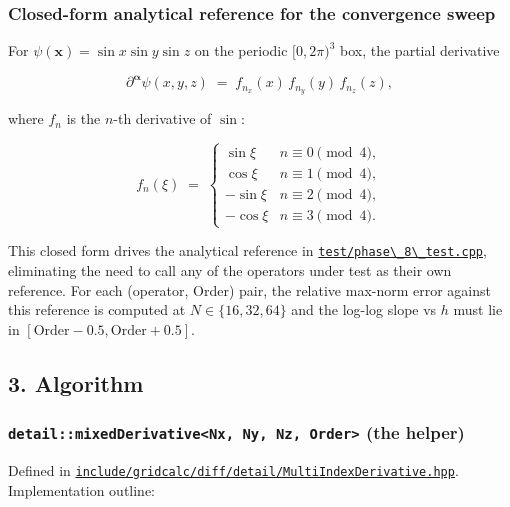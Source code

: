 \subsubsection{Closed-form analytical reference for the convergence
sweep}\label{closed-form-analytical-reference-for-the-convergence-sweep}

For \(\psi(\mathbf{x}) = \sin x \sin y \sin z\) on the periodic
\([0, 2\pi)^3\) box, the partial derivative

\[
\partial^{\boldsymbol\alpha}\psi(x, y, z) \;=\; f_{n_x}(x)\,f_{n_y}(y)\,f_{n_z}(z),
\]

where \(f_n\) is the \(n\)-th derivative of \(\sin\):

\[
f_n(\xi) \;=\; \begin{cases}\sin\xi & n \equiv 0\pmod 4,\\ \cos\xi & n \equiv 1\pmod 4,\\ -\sin\xi & n \equiv 2\pmod 4,\\ -\cos\xi & n \equiv 3\pmod 4.\end{cases}
\]

This closed form drives the analytical reference in
\href{../../../test/phase_8_test.cpp}{\passthrough{\lstinline!test/phase\_8\_test.cpp!}},
eliminating the need to call any of the operators under test as their
own reference. For each (operator, Order) pair, the relative max-norm
error against this reference is computed at \(N \in \{16, 32, 64\}\) and
the log-log slope vs \(h\) must lie in
\([\text{Order} - 0.5, \text{Order} + 0.5]\).

\subsection{3. Algorithm}\label{algorithm}

\subsubsection{\texorpdfstring{\texttt{detail::mixedDerivative\textless{}Nx,\ Ny,\ Nz,\ Order\textgreater{}}
(the
helper)}{detail::mixedDerivative\textless Nx, Ny, Nz, Order\textgreater{} (the helper)}}\label{detailmixedderivativenx-ny-nz-order-the-helper}

Defined in
\href{../../../include/gridcalc/diff/detail/MultiIndexDerivative.hpp}{\passthrough{\lstinline!include/gridcalc/diff/detail/MultiIndexDerivative.hpp!}}.
Implementation outline:

